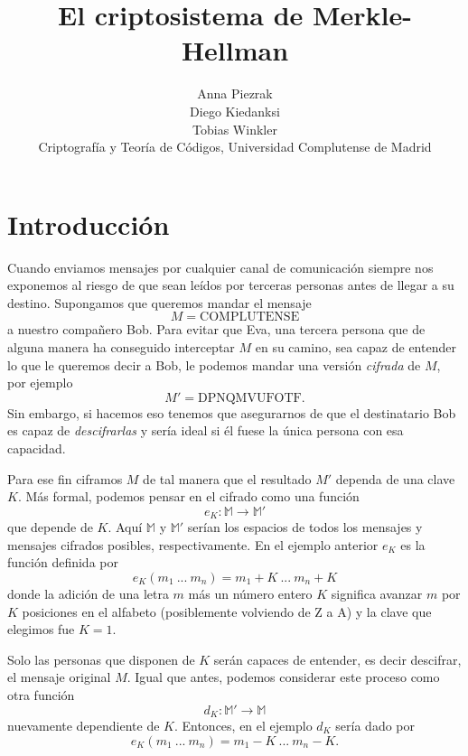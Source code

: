 \documentclass[12pt]{article}
\begin{document}
 
 
 
\title{El criptosistema de Merkle-Hellman}
\author{Anna Piezrak\\Diego Kiedanksi\\Tobias Winkler\\
Criptografía y Teoría de Códigos, Universidad Complutense de Madrid} %
 
\maketitle

\section{Introducción}

Cuando enviamos mensajes por cualquier canal de comunicación siempre nos exponemos al riesgo de que sean leídos por terceras personas antes de llegar a su destino. Supongamos que queremos mandar el mensaje
$$M = \text{COMPLUTENSE}$$
a nuestro compañero Bob. Para evitar que Eva, una tercera persona que de alguna manera ha conseguido interceptar $M$ en su camino, sea capaz de entender lo que le queremos decir a Bob, le podemos mandar una versión \emph{cifrada} de $M$, por ejemplo
$$M' = \text{DPNQMVUFOTF}.$$
Sin embargo, si hacemos eso tenemos que asegurarnos de que el destinatario Bob es capaz de \emph{descifrarlas} y sería ideal si él fuese la única persona con esa capacidad.

Para ese fin ciframos $M$ de tal manera que el resultado $M'$ dependa de una clave $K$. Más formal, podemos pensar en el cifrado como una función
$$e_K : \mathbb{M} \rightarrow \mathbb{M}'$$
que depende de $K$. Aquí $\mathbb{M}$ y $\mathbb{M}'$ serían los espacios de todos los mensajes y mensajes cifrados posibles, respectivamente. En el ejemplo anterior $e_K$ es la función definida por
$$e_K(m_1\ ...\ m_n) = m_1 + K\ ...\ m_n+K$$
donde la adición de una letra $m$ más un número entero $K$ significa avanzar $m$ por $K$ posiciones en el alfabeto (posiblemente volviendo de Z a A) y la clave que elegimos fue $K = 1$.

Solo las personas que disponen de $K$ serán capaces de entender, es decir descifrar, el mensaje original $M$. Igual que antes, podemos considerar este proceso como otra función
$$d_K : \mathbb{M}' \rightarrow \mathbb{M}$$
nuevamente dependiente de $K$. Entonces, en el ejemplo $d_K$ sería dado por
$$e_K(m_1\ ...\ m_n) = m_1 - K\ ...\ m_n - K.$$
\end{document}
